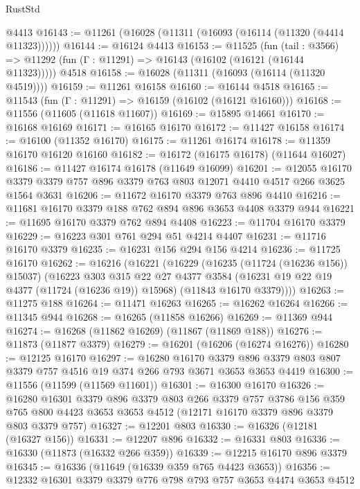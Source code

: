 \begin{lexlean}{RustStd}
\begin{coremodule}
    @4413
@16143 := @11261 (@16028 (@11311 (@16093 (@16114 (@11320 (@4414 @11323))))))
@16144 := @16124 @4413
@16153 := @11525
    (fun (tail : @3566) => @11292 (fun (Γ : @11291) => @16143 (@16102 (@16121 (@16144 @11323)))))
    @4518
@16158 := @16028 (@11311 (@16093 (@16114 (@11320 @4519))))
@16159 := @11261 @16158
@16160 := @16144 @4518
@16165 := @11543 (fun (Γ : @11291) => @16159 (@16102 (@16121 @16160)))
@16168 := @11556 (@11605 (@11618 @11607))
@16169 := @15895 @14661
@16170 := @16168 @16169
@16171 := @16165 @16170
@16172 := @11427 @16158
@16174 := @16100 (@11352 @16170)
@16175 := @11261 @16174
@16178 := @11359 @16170 @16120 @16160
@16182 := @16172 (@16175 @16178) (@11644 @16027)
@16186 := @11427 @16174 @16178 (@11649 @16099)
@16201 := @12055
    @16170
    @3379
    @3379
    @757
    @896
    @3379
    @763
    @803
    @12071
    @4410
    @4517
    @266
    @3625
    @1564
    @3631
@16206 := @11672 @16170 @3379 @763 @896 @4410
@16216 := @11681 @16170 @3379 @188 @762 @894 @896 @3653 @4408 @3379 @944
@16221 := @11695 @16170 @3379 @762 @894 @4408
@16223 := @11704 @16170 @3379
@16229 := @16223 @301 @761 @294 @51 @4214 @4407
@16231 := @11716 @16170 @3379
@16235 := @16231 @156 @294 @156 @4214
@16236 := @11725 @16170
@16262 := @16216
    (@16221
      (@16229
        (@16235 (@11724 (@16236 @156)) @15037)
        (@16223
          @303
          @315
          @22
          @27
          @4377
          @3584
          (@16231 @19 @22 @19 @4377 (@11724 (@16236 @19)) @15968)
          (@11843 @16170 @3379))))
@16263 := @11275 @188
@16264 := @11471 @16263
@16265 := @16262 @16264
@16266 := @11345 @944
@16268 := @16265 (@11858 @16266)
@16269 := @11369 @944
@16274 := @16268 (@11862 @16269) (@11867 (@11869 @188))
@16276 := @11873 (@11877 @3379)
@16279 := @16201 (@16206 (@16274 @16276))
@16280 := @12125 @16170
@16297 := @16280
    @16170
    @3379
    @896
    @3379
    @803
    @807
    @3379
    @757
    @4516
    @19
    @374
    @266
    @793
    @3671
    @3653
    @3653
    @4419
@16300 := @11556 (@11599 (@11569 @11601))
@16301 := @16300 @16170
@16326 := @16280
    @16301
    @3379
    @896
    @3379
    @803
    @266
    @3379
    @757
    @3786
    @156
    @359
    @765
    @800
    @4423
    @3653
    @3653
    @4512
    (@12171 @16170 @3379 @896 @3379 @803 @3379 @757)
@16327 := @12201 @803
@16330 := @16326 (@12181 (@16327 @156))
@16331 := @12207 @896
@16332 := @16331 @803
@16336 := @16330 (@11873 (@16332 @266 @359))
@16339 := @12215 @16170 @896 @3379
@16345 := @16336 (@11649 (@16339 @359 @765 @4423 @3653))
@16356 := @12332 @16301 @3379 @3379 @776 @798 @793 @757 @3653 @4474 @3653 @4512

\end{coremodule}
\end{lexlean}
